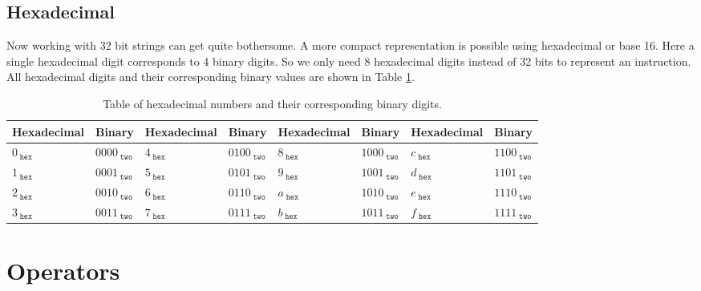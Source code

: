         \subsection{Hexadecimal}
            Now working with 32 bit strings can get quite bothersome. A more compact representation is possible using hexadecimal or base 16. Here a single hexadecimal digit corresponds to 4 binary digits. So we only need 8 hexadecimal digits instead of 32 bits to represent an instruction. All hexadecimal digits and their corresponding binary values are shown in Table \ref{table:Hexadecimal}. 
            
            \begin{table}[h!]
                \centering
                \begin{tabular}{|l|l||l|l||l|l||l|l|}
                	\hline
                	Hexadecimal           & Binary                   & Hexadecimal           & Binary                   & Hexadecimal           & Binary                   & Hexadecimal           & Binary                   \\ \hline
                	$0_{\; \texttt{hex}}$ & $0000_{\; \texttt{two}}$ & $4_{\; \texttt{hex}}$ & $0100_{\; \texttt{two}}$ & $8_{\; \texttt{hex}}$ & $1000_{\; \texttt{two}}$ & $c_{\; \texttt{hex}}$ & $1100_{\; \texttt{two}}$ \\
                	$1_{\; \texttt{hex}}$ & $0001_{\; \texttt{two}}$ & $5_{\; \texttt{hex}}$ & $0101_{\; \texttt{two}}$ & $9_{\; \texttt{hex}}$ & $1001_{\; \texttt{two}}$ & $d_{\; \texttt{hex}}$ & $1101_{\; \texttt{two}}$ \\
                	$2_{\; \texttt{hex}}$ & $0010_{\; \texttt{two}}$ & $6_{\; \texttt{hex}}$ & $0110_{\; \texttt{two}}$ & $a_{\; \texttt{hex}}$ & $1010_{\; \texttt{two}}$ & $e_{\; \texttt{hex}}$ & $1110_{\; \texttt{two}}$ \\
                	$3_{\; \texttt{hex}}$ & $0011_{\; \texttt{two}}$ & $7_{\; \texttt{hex}}$ & $0111_{\; \texttt{two}}$ & $b_{\; \texttt{hex}}$ & $1011_{\; \texttt{two}}$ & $f_{\; \texttt{hex}}$ & $1111_{\; \texttt{two}}$ \\ \hline
                \end{tabular}
                \caption{Table of hexadecimal numbers and their corresponding binary digits.}
                \label{table:Hexadecimal}
            \end{table}
            
            
    

\section{Operators}
    